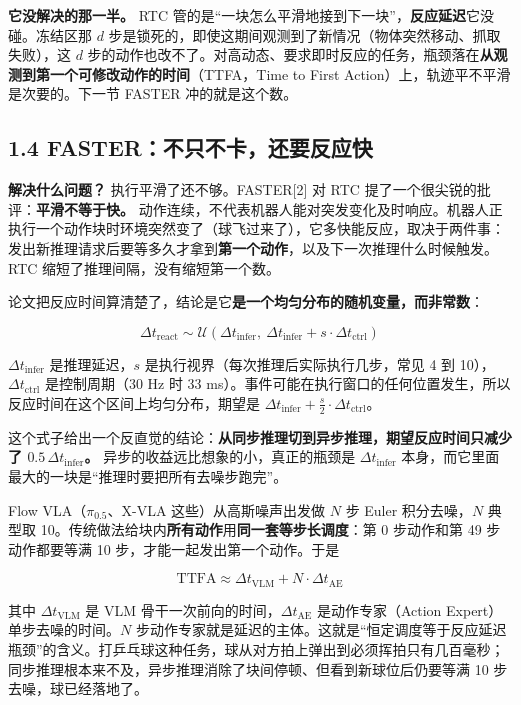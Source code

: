 \documentclass[
  chinese,
]{ctexart}
\begin{document}
\textbf{它没解决的那一半。} RTC
管的是``一块怎么平滑地接到下一块''，\textbf{反应延迟}它没碰。冻结区那
\(d\) 步是锁死的，即使这期间观测到了新情况（物体突然移动、抓取失败），这
\(d\)
步的动作也改不了。对高动态、要求即时反应的任务，瓶颈落在\textbf{从观测到第一个可修改动作的时间}（TTFA，Time
to First Action）上，轨迹平不平滑是次要的。下一节 FASTER
冲的就是这个数。

\subsection{1.4
FASTER：不只不卡，还要反应快}\label{fasterux4e0dux53eaux4e0dux5361ux8fd8ux8981ux53cdux5e94ux5feb}

\textbf{解决什么问题？} 执行平滑了还不够。FASTER{[}2{]} 对 RTC
提了一个很尖锐的批评：\textbf{平滑不等于快。}
动作连续，不代表机器人能对突发变化及时响应。机器人正执行一个动作块时环境突然变了（球飞过来了），它多快能反应，取决于两件事：发出新推理请求后要等多久才拿到\textbf{第一个动作}，以及下一次推理什么时候触发。RTC
缩短了推理间隔，没有缩短第一个数。

论文把反应时间算清楚了，结论是它\textbf{是一个均匀分布的随机变量，而非常数}：

\[\Delta t_{\text{react}} \sim \mathcal{U}\!\left(\Delta t_{\text{infer}},\ \Delta t_{\text{infer}} + s \cdot \Delta t_{\text{ctrl}}\right)\]

\(\Delta t_{\text{infer}}\) 是推理延迟，\(s\)
是执行视界（每次推理后实际执行几步，常见 4 到
10），\(\Delta t_{\text{ctrl}}\) 是控制周期（30 Hz 时 33
ms）。事件可能在执行窗口的任何位置发生，所以反应时间在这个区间上均匀分布，期望是
\(\Delta t_{\text{infer}} + \frac{s}{2} \cdot \Delta t_{\text{ctrl}}\)。

这个式子给出一个反直觉的结论：\textbf{从同步推理切到异步推理，期望反应时间只减少了
\(0.5\,\Delta t_{\text{infer}}\)。} 异步的收益远比想象的小，真正的瓶颈是
\(\Delta t_{\text{infer}}\)
本身，而它里面最大的一块是``推理时要把所有去噪步跑完''。

Flow VLA（\(\pi_{0.5}\)、X-VLA 这些）从高斯噪声出发做 \(N\) 步 Euler
积分去噪，\(N\) 典型取
10。传统做法给块内\textbf{所有动作}用\textbf{同一套等步长调度}：第 0
步动作和第 49 步动作都要等满 10 步，才能一起发出第一个动作。于是

\[\text{TTFA} \approx \Delta t_{\text{VLM}} + N \cdot \Delta t_{\text{AE}}\]

其中 \(\Delta t_{\text{VLM}}\) 是 VLM
骨干一次前向的时间，\(\Delta t_{\text{AE}}\) 是动作专家（Action
Expert）单步去噪的时间。\(N\)
步动作专家就是延迟的主体。这就是``恒定调度等于反应延迟瓶颈''的含义。打乒乓球这种任务，球从对方拍上弹出到必须挥拍只有几百毫秒；同步推理根本来不及，异步推理消除了块间停顿、但看到新球位后仍要等满
10 步去噪，球已经落地了。
\end{document}
